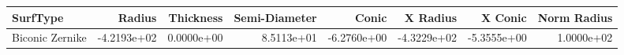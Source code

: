 \begin{tabular}{lrrrrrrr}
\toprule
       SurfType &      Radius &  Thickness &  Semi-Diameter &       Conic &    X Radius &     X Conic &  Norm Radius \\
\midrule
Biconic Zernike & -4.2193e+02 & 0.0000e+00 &     8.5113e+01 & -6.2760e+00 & -4.3229e+02 & -5.3555e+00 &   1.0000e+02 \\
\bottomrule
\end{tabular}
